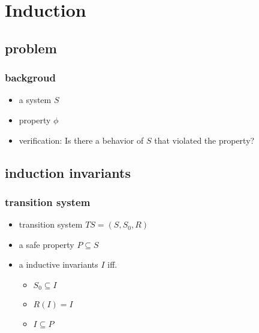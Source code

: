 \section{Induction}
\subsection{problem}
\begin{frame}
    \frametitle{backgroud}
    \begin{itemize}
        \item a system $S$
        \item property $\phi$
        \item verification: Is there a behavior of $S$ that violated the property?
    \end{itemize}
\end{frame}

\subsection{induction invariants}
\begin{frame}
    \frametitle{transition system}
    \begin{itemize}
        \item transition system $TS=(S,S_{0},R)$
        \item a safe property $P\subseteq S$
        \item a inductive invariants $I$ iff.
        \begin{itemize}
            \item $S_{0}\subseteq I$
            \item $R(I)=I$
            \item $I\subseteq P$
        \end{itemize}
    \end{itemize}
\end{frame}

